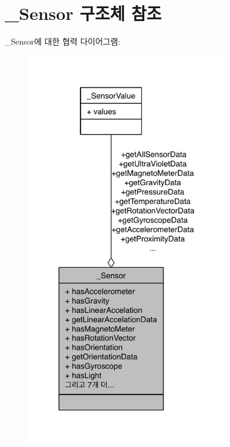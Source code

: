 \hypertarget{struct___sensor}{\section{\-\_\-\-Sensor 구조체 참조}
\label{struct___sensor}
}


\-\_\-\-Sensor에 대한 협력 다이어그램\-:\nopagebreak
\begin{figure}[H]
\begin{center}
\leavevmode
\includegraphics[width=252pt]{struct___sensor__coll__graph}
\end{center}
\end{figure}
